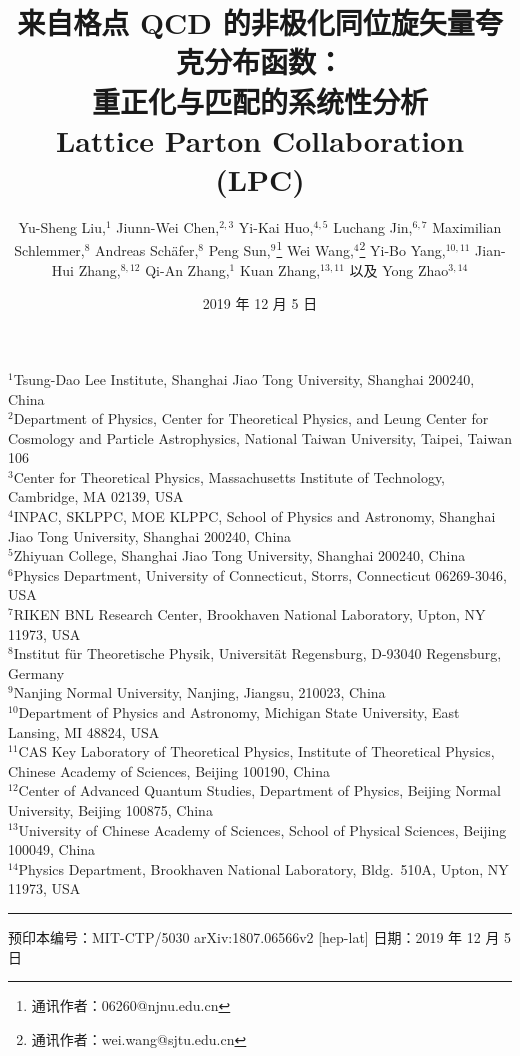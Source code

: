 \documentclass[11pt]{ctexart}
\title{来自格点 QCD 的非极化同位旋矢量夸克分布函数：\\
重正化与匹配的系统性分析\\[1.2ex]
\large Lattice Parton Collaboration (LPC)}
\author{Yu-Sheng Liu,$^{1}$%
 Jiunn-Wei Chen,$^{2,3}$%
 Yi-Kai Huo,$^{4,5}$%
 Luchang Jin,$^{6,7}$%
 Maximilian Schlemmer,$^{8}$%
 Andreas Sch\"afer,$^{8}$%
 Peng Sun,$^{9}$\footnote{通讯作者：06260@njnu.edu.cn}%
 Wei Wang,$^{4}$\footnote{通讯作者：wei.wang@sjtu.edu.cn}%
 Yi-Bo Yang,$^{10,11}$%
 Jian-Hui Zhang,$^{8,12}$%
 Qi-An Zhang,$^{1}$%
 Kuan Zhang,$^{13,11}$%
 以及 Yong Zhao$^{3,14}$}
\date{2019 年 12 月 5 日}
\begin{document}
\maketitle

\noindent\begin{minipage}{\textwidth}
\footnotesize
\begin{flushleft}
$^{1}$Tsung-Dao Lee Institute, Shanghai Jiao Tong University, Shanghai 200240, China\\
$^{2}$Department of Physics, Center for Theoretical Physics, and Leung Center for Cosmology and Particle Astrophysics, National Taiwan University, Taipei, Taiwan 106\\
$^{3}$Center for Theoretical Physics, Massachusetts Institute of Technology, Cambridge, MA 02139, USA\\
$^{4}$INPAC, SKLPPC, MOE KLPPC, School of Physics and Astronomy, Shanghai Jiao Tong University, Shanghai 200240, China\\
$^{5}$Zhiyuan College, Shanghai Jiao Tong University, Shanghai 200240, China\\
$^{6}$Physics Department, University of Connecticut, Storrs, Connecticut 06269-3046, USA\\
$^{7}$RIKEN BNL Research Center, Brookhaven National Laboratory, Upton, NY 11973, USA\\
$^{8}$Institut f\"ur Theoretische Physik, Universit\"at Regensburg, D-93040 Regensburg, Germany\\
$^{9}$Nanjing Normal University, Nanjing, Jiangsu, 210023, China\\
$^{10}$Department of Physics and Astronomy, Michigan State University, East Lansing, MI 48824, USA\\
$^{11}$CAS Key Laboratory of Theoretical Physics, Institute of Theoretical Physics, Chinese Academy of Sciences, Beijing 100190, China\\
$^{12}$Center of Advanced Quantum Studies, Department of Physics, Beijing Normal University, Beijing 100875, China\\
$^{13}$University of Chinese Academy of Sciences, School of Physical Sciences, Beijing 100049, China\\
$^{14}$Physics Department, Brookhaven National Laboratory, Bldg.\ 510A, Upton, NY 11973, USA
\end{flushleft}
\hrule\vspace{0.4ex}
\noindent 预印本编号：MIT-CTP/5030 \quad arXiv:1807.06566v2 [hep-lat] \quad 日期：2019 年 12 月 5 日
\end{minipage}
\vspace{1em}
\end{document}
